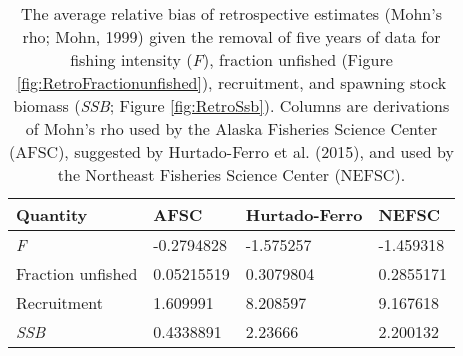 
\begin{longtable}[t]{llll}
\caption{\label{tab:RetroMohnsrho}The average relative bias of retrospective estimates (Mohn's rho; Mohn, 1999) given the removal of five years of data for fishing intensity (\emph{F}), fraction unfished (Figure \ref{fig:RetroFractionunfished}),  recruitment, and spawning stock biomass (\emph{SSB}; Figure \ref{fig:RetroSsb}). Columns are derivations of Mohn's rho used by the Alaska Fisheries Science Center (AFSC), suggested by Hurtado-Ferro et al. (2015), and used by the Northeast Fisheries Science Center (NEFSC).}\\
\toprule
Quantity & AFSC & Hurtado-Ferro & NEFSC\\
\midrule
\emph{F} & -0.2794828 & -1.575257 & -1.459318\\
Fraction unfished & 0.05215519 & 0.3079804 & 0.2855171\\
Recruitment & 1.609991 & 8.208597 & 9.167618\\
\emph{SSB} & 0.4338891 & 2.23666 & 2.200132\\
\bottomrule
\end{longtable}
